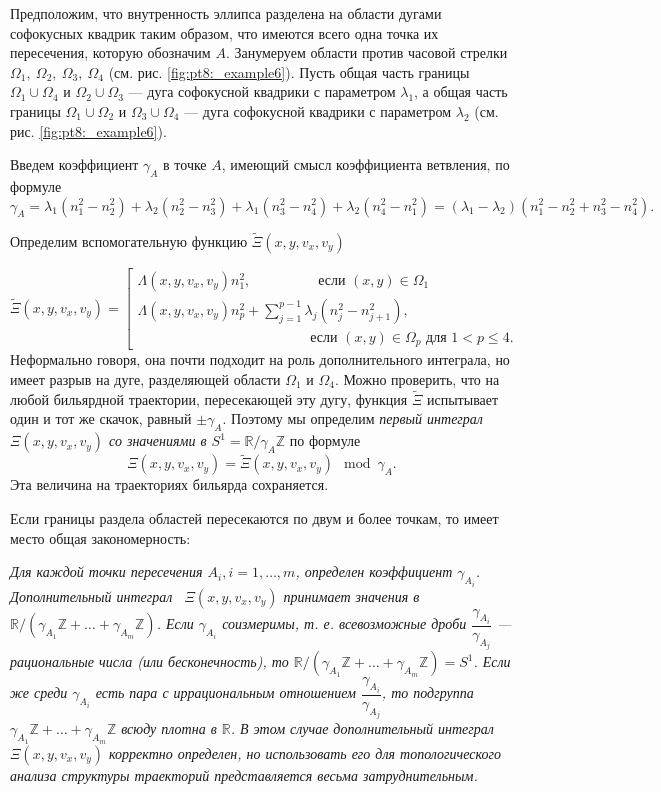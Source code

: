 Предположим, что внутренность эллипса разделена на области дугами софокусных квадрик таким образом, что имеются всего одна точка их пересечения, которую обозначим $A$.
Занумеруем области против часовой стрелки $\Omega_1, \ \Omega_2, \ \Omega_3, \ \Omega_4$ (см. рис. \ref{fig:pt8:_example6}).
Пусть общая часть границы $\Omega_1 \cup \Omega_4$ и $\Omega_2 \cup \Omega_3$ --- дуга софокусной квадрики с параметром $\lambda_1$, а общая часть границы $\Omega_1 \cup \Omega_2$ и $\Omega_3 \cup \Omega_4$ --- дуга софокусной квадрики с параметром $\lambda_2$ (см. рис. \ref{fig:pt8:_example6}).

Введем коэффициент $\gamma_A$ в точке $A$, имеющий смысл коэффициента ветвления, по формуле $$\gamma_A = \lambda_1(n_1^2 - n_2^2) + \lambda_2(n_2^2-n_3^2) + \lambda_1(n_3^2-n_4^2) + \lambda_2(n_4^2-n_1^2) = (\lambda_1 - \lambda_2) ( n_1^2 - n_2^2 + n_3^2 - n_4^2).$$

Определим вспомогательную функцию $\widetilde{\Xi}(x, y, v_x, v_y)$ 

\begin{equation*}
\widetilde{\Xi}(x, y, v_x, v_y) = \left[
\begin{array}{ll}
    \Lambda(x, y, v_x, v_y) n_1^2, \qquad  \  \ \qquad   \text{ если } (x,y) \in \Omega_1 
    \\
    \Lambda(x, y, v_x, v_y) n_p^2 + \sum_{j=1}^{p-1} \lambda_j(n_j^2-n_{j+1}^2), \\
     \qquad \qquad \qquad \qquad \qquad \qquad  \text{ если } (x,y) \in \Omega_p \text{ для } 1 < p \leq 4. 
\end{array}
\right.
\end{equation*}
Неформально говоря, она почти подходит на роль дополнительного интеграла, но имеет разрыв на дуге, разделяющей области $\Omega_1$ и $\Omega_4$. Можно проверить, что на любой бильярдной траектории, пересекающей эту дугу, функция $\widetilde{\Xi}$ испытывает один и тот же скачок, равный  $\pm \gamma_A$. 
Поэтому мы определим \textit{первый интеграл $\Xi(x, y, v_x, v_y)$ со значениями в $S^1= \mathbb{R}/\gamma_A \mathbb{Z}$ }по формуле $$\Xi(x, y, v_x, v_y) = \widetilde{\Xi}(x, y, v_x, v_y) \mod \gamma_A.$$
Эта величина на траекториях бильярда сохраняется.
\bigskip

Если границы раздела областей пересекаются по двум и более точкам, то имеет место общая закономерность: 
\medskip

\textit{ 
\noindent Для каждой точки пересечения $A_i, i=1,\ldots,m$, определен коэффициент $\gamma_{A_i}$. Дополнительный интеграл \  $\Xi(x, y, v_x, v_y)$ принимает значения в $\mathbb{R}/(\gamma_{A_1} \mathbb{Z}+ \ldots + \gamma_{A_m} \mathbb{Z})$. Если $\gamma_{A_i}$ соизмеримы, т. е. всевозможные дроби $\dfrac{\gamma_{A_i}}{\gamma_{A_j}}$ --- рациональные числа (или бесконечность), то $\mathbb{R}/(\gamma_{A_1} \mathbb{Z}+ \ldots + \gamma_{A_m} \mathbb{Z}) = S^1$. Если же среди $\gamma_{A_i}$ есть пара с иррациональным отношением $\dfrac{\gamma_{A_i}}{\gamma_{A_j}}$, то подгруппа $\gamma_{A_1} \mathbb{Z}+ \ldots + \gamma_{A_m} \mathbb{Z}$ всюду плотна в $\mathbb{R}$. В этом случае дополнительный интеграл $\Xi(x, y, v_x, v_y)$ корректно определен, но использовать его для топологического анализа структуры траекторий представляется весьма затруднительным.}

